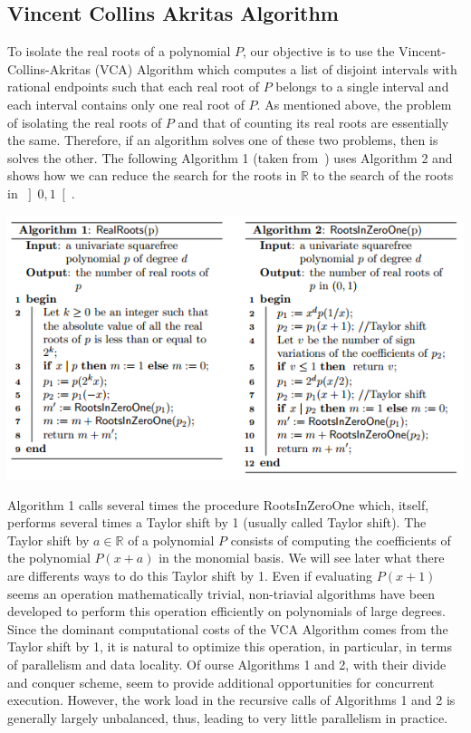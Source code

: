 \subsection{Vincent Collins Akritas Algorithm}
To isolate the real roots of a polynomial $P$, our objective is to use the Vincent-Collins-Akritas (VCA) Algorithm which computes a list of disjoint intervals with rational endpoints such that each real root of $P$ belongs to a single interval and each interval contains only one real root of $P$. As mentioned above, the problem of isolating the real roots of $P$ and that of counting its real roots are essentially the same. Therefore, if an algorithm solves one of these two problems, then is solves the other. The following Algorithm 1  (taken from~\cite{CacheComp}) uses Algorithm 2 and shows how we can reduce the search  for the roots in $\mathbb{R}$ to the search of the roots in $\left]0, 1\right[$.

\begin{center}
\includegraphics[scale=1]{VCAalgo.png}
\end{center}

Algorithm 1 calls several times the procedure RootsInZeroOne 
which, itself,  performs several times a Taylor shift by 1
(usually called Taylor shift). 
The Taylor shift by $a\in\mathbb{R}$ of a polynomial $P$ 
consists of computing the coefficients of the
polynomial $P(x+a)$ in the monomial basis.
 We will see later what there are differents ways to do this Taylor shift by 1.
Even if evaluating $P(x+1)$ seems an operation mathematically trivial,
non-triavial algorithms have been developed to perform
this operation efficiently on polynomials of large degrees.\\

Since the dominant computational costs of the VCA Algorithm
comes from the Taylor shift by 1, it is natural
to optimize this operation, in particular, in terms
of parallelism and data locality.
Of ourse Algorithms 1 and 2, with their divide and conquer 
scheme, seem to provide additional opportunities
for concurrent execution.
However, the work load in the recursive calls of Algorithms 1 and 2
is generally largely unbalanced, thus, leading to very little
parallelism in practice.
